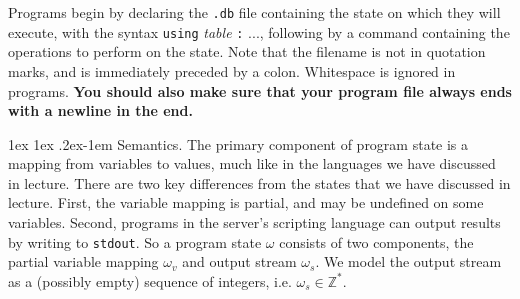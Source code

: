 \documentclass[11pt]{article}
\makeatletter
\renewcommand{\paragraph}{%
  \@startsection{paragraph}{4}%
  {\z@}{1ex \@plus 1ex \@minus .2ex}{-1em}%
  {\normalfont\normalsize\bfseries}
}
\makeatother
\begin{document}
Programs begin by declaring the \verb'.db' file containing the state on which they will execute, with the syntax \verb'using' \textit{table} \verb':' ..., following by a command containing the operations to perform on the state. Note that the filename is not in quotation marks, and is immediately preceded by a colon. Whitespace is ignored in programs. \textbf{You should also make sure that your program file always ends with a newline in the end.}

\paragraph{Semantics.} The primary component of program state is a mapping from variables to values, much like in the languages we have discussed in lecture. There are two key differences from the states that we have discussed in lecture. First, the variable mapping is partial, and may be undefined on some variables. Second, programs in the server's scripting language can output results by writing to \verb'stdout'. So a program state $\omega$ consists of two components, the partial variable mapping $\omega_v$ and output stream $\omega_s$. We model the output stream as a (possibly empty) sequence of integers, i.e. $\omega_s \in \mathbb{Z}^{*}$.
\end{document}
